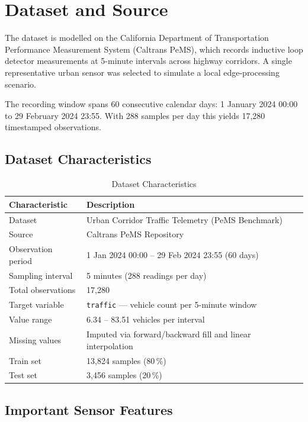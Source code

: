 \documentclass[12pt,a4paper]{article}
\begin{document}
\section{Dataset and Source}

The dataset is modelled on the California Department of Transportation Performance
Measurement System (Caltrans PeMS), which records inductive loop detector measurements
at 5-minute intervals across highway corridors.  A single representative urban sensor
was selected to simulate a local edge-processing scenario.

The recording window spans 60 consecutive calendar days:
1 January 2024 00:00 to 29 February 2024 23:55.  With 288 samples per day this
yields 17,280 timestamped observations.

\subsection{Dataset Characteristics}

\begin{table}[H]
  \centering
  \caption{Dataset Characteristics}
  \label{tab:dataset}
  \renewcommand{\arraystretch}{1.3}
  \begin{tabular}{ll}
    \toprule
    \textbf{Characteristic} & \textbf{Description} \\
    \midrule
    Dataset         & Urban Corridor Traffic Telemetry (PeMS Benchmark) \\
    Source          & Caltrans PeMS Repository \\
    Observation period & 1 Jan 2024 00:00 -- 29 Feb 2024 23:55 (60 days) \\
    Sampling interval & 5 minutes (288 readings per day) \\
    Total observations & 17,280 \\
    Target variable & \texttt{traffic} --- vehicle count per 5-minute window \\
    Value range     & 6.34 -- 83.51 vehicles per interval \\
    Missing values  & Imputed via forward/backward fill and linear interpolation \\
    Train set       & 13,824 samples (80\,\%) \\
    Test set        & 3,456 samples (20\,\%) \\
    \bottomrule
  \end{tabular}
\end{table}

\subsection{Important Sensor Features}
\end{document}
